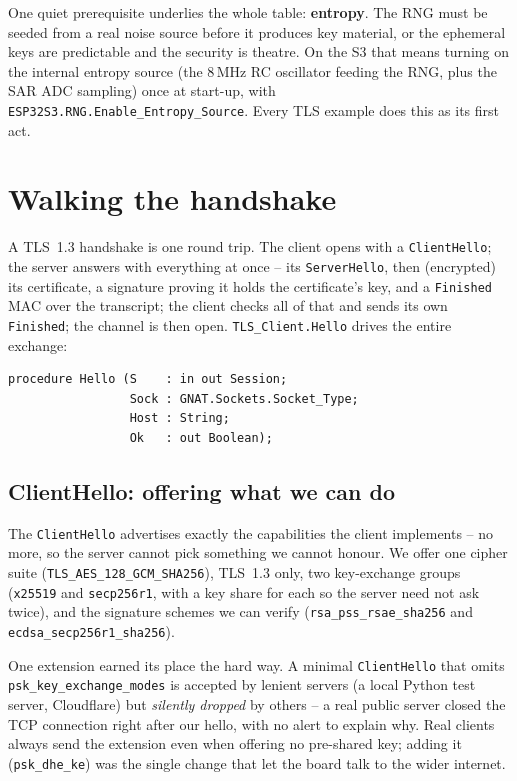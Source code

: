 One quiet prerequisite underlies the whole table: \textbf{entropy}. The RNG must be
seeded from a real noise source before it produces key material, or the ephemeral
keys are predictable and the security is theatre. On the S3 that means turning on
the internal entropy source (the 8\,MHz RC oscillator feeding the RNG, plus the SAR
ADC sampling) once at start-up, with \texttt{ESP32S3.RNG.Enable\_Entropy\_Source}.
Every TLS example does this as its first act.

\section{Walking the handshake}
\label{ch:tls:handshake}

A TLS~1.3 handshake is one round trip. The client opens with a
\texttt{ClientHello}; the server answers with everything at once -- its
\texttt{ServerHello}, then (encrypted) its certificate, a signature proving it
holds the certificate's key, and a \texttt{Finished} MAC over the transcript; the
client checks all of that and sends its own \texttt{Finished}; the channel is then
open. \texttt{TLS\_Client.Hello} drives the entire exchange:

\begin{lstlisting}
procedure Hello (S    : in out Session;
                 Sock : GNAT.Sockets.Socket_Type;
                 Host : String;
                 Ok   : out Boolean);
\end{lstlisting}

\subsection{ClientHello: offering what we can do}

The \texttt{ClientHello} advertises exactly the capabilities the client
implements -- no more, so the server cannot pick something we cannot honour. We
offer one cipher suite (\texttt{TLS\_AES\_128\_GCM\_SHA256}), TLS~1.3 only, two
key-exchange groups (\texttt{x25519} and \texttt{secp256r1}, with a key share for
each so the server need not ask twice), and the signature schemes we can verify
(\texttt{rsa\_pss\_rsae\_sha256} and \texttt{ecdsa\_secp256r1\_sha256}).

One extension earned its place the hard way. A minimal \texttt{ClientHello} that
omits \texttt{psk\_key\_exchange\_modes} is accepted by lenient servers (a local
Python test server, Cloudflare) but \emph{silently dropped} by others -- a real
public server closed the TCP connection right after our hello, with no alert to
explain why. Real clients always send the extension even when offering no
pre-shared key; adding it (\texttt{psk\_dhe\_ke}) was the single change that let
the board talk to the wider internet.

